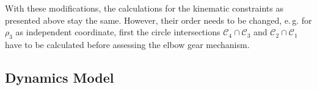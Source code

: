 \documentclass[letterpaper, 10 pt, conference]{ieeeconf}  %
\newcommand{\cc}[1]{\mathcal{C}_{#1}}
\begin{document}
With these modifications, the calculations for the kinematic constraints as presented above stay the same. However, their order needs to be changed, e.\,g. for $\rho_3$ as independent coordinate, first the circle intersections ${\cc{4}\cap\cc{3}}$ and ${\cc{2}\cap\cc{1}}$ have to be calculated before assessing the elbow gear mechanism.

%
%

\subsection{Dynamics Model}
\label{sec:Lagrange2Elim}
\end{document}
